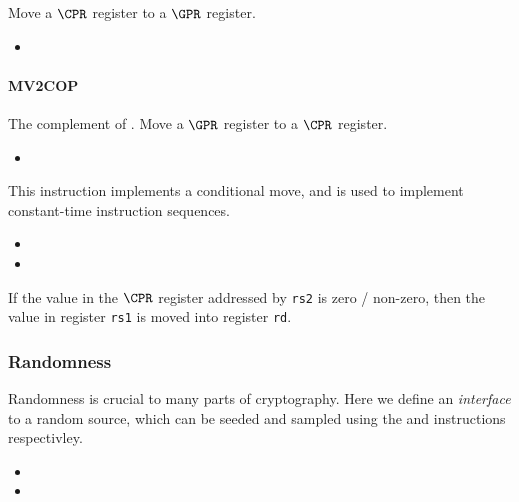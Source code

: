 Move a $\CPR$ register to a $\GPR$ register.

\begin{itemize}
\item {}
\end{itemize}


\paragraph{MV2COP}

The complement of .
Move a $\GPR$ register to a $\CPR$ register.

\begin{itemize}
\item {}
\end{itemize}


This instruction implements a conditional move, and is used to implement
constant-time instruction sequences.

\begin{itemize}
\item {}
\item {}
\end{itemize}

If the value in the $\CPR$ register addressed by {\tt rs2} is
zero / non-zero, then the value in register {\tt rs1} is moved
into register {\tt rd}.

\subsubsection{Randomness}

Randomness is crucial to many parts of cryptography. Here we define an 
{\em interface} to a random source, which can be seeded and sampled using
the  and  instructions respectivley.

\begin{itemize}
\item {}
\item {}
\end{itemize}

